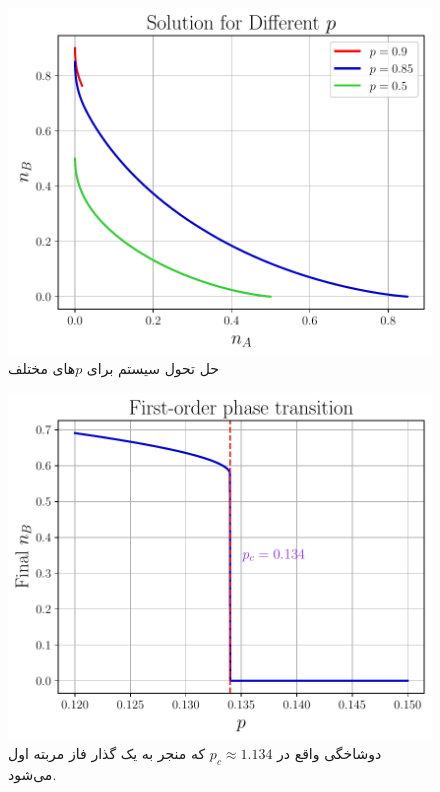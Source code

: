 \documentclass[12pt,a4paper]{article}
\begin{document}
	\subsection{}
	\begin{figure}[h!]
		\centering
		\includegraphics[width=\linewidth]{fig/8.1.15.solution.pdf}
		\caption{حل تحول سیستم برای $p$های مختلف}
	\end{figure}
	\begin{figure}[h!]
		\centering
		\includegraphics[width=\linewidth]{fig/8.1.15.bifurcation.pdf}
		\caption{دوشاخگی واقع در $p_c\approx1.134$ که منجر به یک گذار فاز مربته اول می‌شود.}
	\end{figure}
	\FloatBarrier
\end{document}
